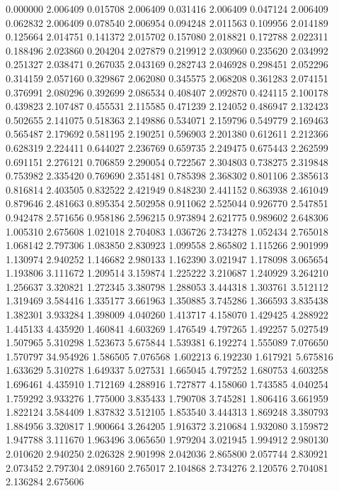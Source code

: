 0.000000	2.006409 
0.015708	2.006409 
0.031416	2.006409 
0.047124	2.006409 
0.062832	2.006409 
0.078540	2.006954 
0.094248	2.011563 
0.109956	2.014189 
0.125664	2.014751 
0.141372	2.015702 
0.157080	2.018821 
0.172788	2.022311 
0.188496	2.023860 
0.204204	2.027879 
0.219912	2.030960 
0.235620	2.034992 
0.251327	2.038471 
0.267035	2.043169 
0.282743	2.046928 
0.298451	2.052296 
0.314159	2.057160 
0.329867	2.062080 
0.345575	2.068208 
0.361283	2.074151 
0.376991	2.080296 
0.392699	2.086534 
0.408407	2.092870 
0.424115	2.100178 
0.439823	2.107487 
0.455531	2.115585 
0.471239	2.124052 
0.486947	2.132423 
0.502655	2.141075 
0.518363	2.149886 
0.534071	2.159796 
0.549779	2.169463 
0.565487	2.179692 
0.581195	2.190251 
0.596903	2.201380 
0.612611	2.212366 
0.628319	2.224411 
0.644027	2.236769 
0.659735	2.249475 
0.675443	2.262599 
0.691151	2.276121 
0.706859	2.290054 
0.722567	2.304803 
0.738275	2.319848 
0.753982	2.335420 
0.769690	2.351481 
0.785398	2.368302 
0.801106	2.385613 
0.816814	2.403505 
0.832522	2.421949 
0.848230	2.441152 
0.863938	2.461049 
0.879646	2.481663 
0.895354	2.502958 
0.911062	2.525044 
0.926770	2.547851 
0.942478	2.571656 
0.958186	2.596215 
0.973894	2.621775 
0.989602	2.648306 
1.005310	2.675608 
1.021018	2.704083 
1.036726	2.734278 
1.052434	2.765018 
1.068142	2.797306 
1.083850	2.830923 
1.099558	2.865802 
1.115266	2.901999 
1.130974	2.940252 
1.146682	2.980133 
1.162390	3.021947 
1.178098	3.065654 
1.193806	3.111672 
1.209514	3.159874 
1.225222	3.210687 
1.240929	3.264210 
1.256637	3.320821 
1.272345	3.380798 
1.288053	3.444318 
1.303761	3.512112 
1.319469	3.584416 
1.335177	3.661963 
1.350885	3.745286 
1.366593	3.835438 
1.382301	3.933284 
1.398009	4.040260 
1.413717	4.158070 
1.429425	4.288922 
1.445133	4.435920 
1.460841	4.603269 
1.476549	4.797265 
1.492257	5.027549 
1.507965	5.310298 
1.523673	5.675844 
1.539381	6.192274 
1.555089	7.076650 
1.570797	34.954926 
1.586505	7.076568 
1.602213	6.192230 
1.617921	5.675816 
1.633629	5.310278 
1.649337	5.027531 
1.665045	4.797252 
1.680753	4.603258 
1.696461	4.435910 
1.712169	4.288916 
1.727877	4.158060 
1.743585	4.040254 
1.759292	3.933276 
1.775000	3.835433 
1.790708	3.745281 
1.806416	3.661959 
1.822124	3.584409 
1.837832	3.512105 
1.853540	3.444313 
1.869248	3.380793 
1.884956	3.320817 
1.900664	3.264205 
1.916372	3.210684 
1.932080	3.159872 
1.947788	3.111670 
1.963496	3.065650 
1.979204	3.021945 
1.994912	2.980130 
2.010620	2.940250 
2.026328	2.901998 
2.042036	2.865800 
2.057744	2.830921 
2.073452	2.797304 
2.089160	2.765017 
2.104868	2.734276 
2.120576	2.704081 
2.136284	2.675606 
